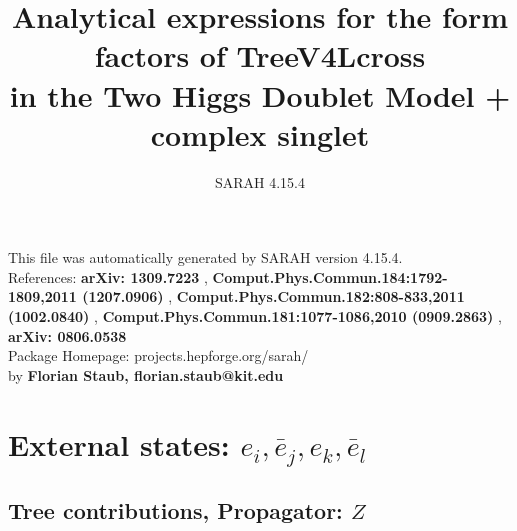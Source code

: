 \documentclass[A4,landscape]{article}
\begin{document}
\title{Analytical expressions for the form factors of TreeV4Lcross\\ in the Two Higgs Doublet Model + complex singlet } 
 \author{SARAH 4.15.4} 
 \maketitle 
 \vspace{10cm} 
This file was automatically generated by SARAH version 4.15.4.  \\ 
References: {\bf arXiv: 1309.7223 }, {\bf Comput.Phys.Commun.184:1792-1809,2011 (1207.0906) }, {\bf Comput.Phys.Commun.182:808-833,2011 (1002.0840) }, {\bf Comput.Phys.Commun.181:1077-1086,2010 (0909.2863) }, {\bf arXiv: 0806.0538 } \\ 
Package Homepage: projects.hepforge.org/sarah/ \\ 
by {\bf Florian Staub, florian.staub@kit.edu} 
 \pagebreak 
 \tableofcontents 
 \pagebreak 
\section{External states: ${e_{{i}}, \bar{e}_{{j}}, e_{{k}}, \bar{e}_{{l}}}$} 
\subsection{Tree contributions, Propagator: $Z$} 
\end{document}
